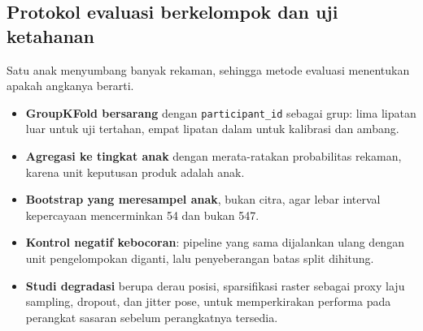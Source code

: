 \documentclass{article}
\begin{document}
\subsection*{Protokol evaluasi berkelompok dan uji ketahanan}
\label{sec:tp-evaluasi}

Satu anak menyumbang banyak rekaman, sehingga metode evaluasi menentukan apakah angkanya
berarti.

\begin{itemize}
\item \textbf{GroupKFold bersarang} dengan \texttt{participant\_id} sebagai grup: lima
      lipatan luar untuk uji tertahan, empat lipatan dalam untuk kalibrasi dan ambang.
\item \textbf{Agregasi ke tingkat anak} dengan merata-ratakan probabilitas rekaman, karena
      unit keputusan produk adalah anak.
\item \textbf{Bootstrap yang meresampel anak}, bukan citra, agar lebar interval kepercayaan
      mencerminkan 54 dan bukan 547.
\item \textbf{Kontrol negatif kebocoran}: pipeline yang sama dijalankan ulang dengan unit
      pengelompokan diganti, lalu penyeberangan batas split dihitung.
\item \textbf{Studi degradasi} berupa derau posisi, sparsifikasi raster sebagai proxy laju
      sampling, dropout, dan jitter pose, untuk memperkirakan performa pada perangkat sasaran
      sebelum perangkatnya tersedia.
\end{itemize}
\end{document}
